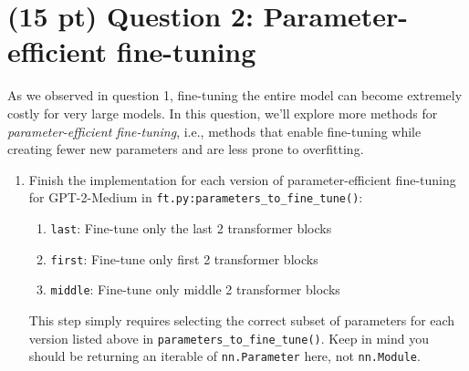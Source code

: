 \documentclass[12pt]{article}
\begin{document}
\section*{(15 pt) Question 2: Parameter-efficient fine-tuning}
As we observed in question 1, fine-tuning the entire model can become extremely costly for very large models. In this question, we'll explore more methods for \textit{parameter-efficient fine-tuning}, i.e., methods that enable fine-tuning while creating fewer new parameters and are less prone to overfitting.
\begin{enumerate}
    \item Finish the implementation for each version of parameter-efficient fine-tuning for GPT-2-Medium in \texttt{ft.py:parameters\_to\_fine\_tune()}:
    \begin{enumerate}
        \item \texttt{last}: Fine-tune only the last 2 transformer blocks
        \item \texttt{first}: Fine-tune only first 2 transformer blocks
        \item \texttt{middle}: Fine-tune only middle 2 transformer blocks
    \end{enumerate}
    This step simply requires selecting the correct subset of parameters for each version listed above in \texttt{parameters\_to\_fine\_tune()}. Keep in mind you should be returning an iterable of \texttt{nn.Parameter} here, not \texttt{nn.Module}.


\end{enumerate}
\end{document}
